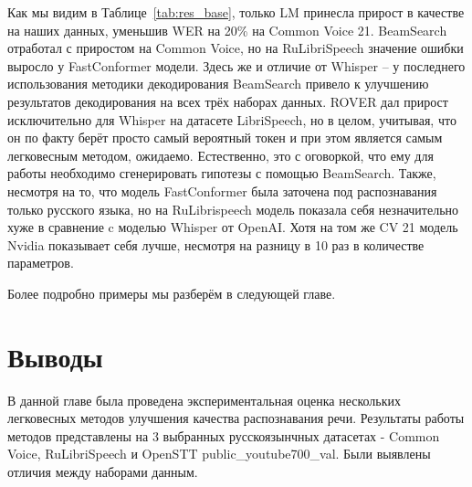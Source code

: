 Как мы видим в Таблице~\ref{tab:res_base}, только LM принесла прирост в качестве на наших данных, уменьшив WER на 20\% на Common Voice 21.
BeamSearch отработал с приростом на Common Voice, но на RuLibriSpeech значение ошибки выросло у FastConformer модели.
Здесь же и отличие от Whisper -- у последнего использования методики декодирования BeamSearch привело к улучшению результатов декодирования на всех трёх наборах данных.
ROVER дал прирост исключительно для Whisper на датасете LibriSpeech, но в целом, учитывая, что он по факту берёт просто самый вероятный токен и при этом является самым легковесным методом, ожидаемо.
Естественно, это с оговоркой, что ему для работы необходимо сгенерировать гипотезы с помощью BeamSearch.
Также, несмотря на то, что модель FastConformer была заточена под распознавания только русского языка, но на RuLibrispeech модель показала себя незначительно хуже в сравнение c моделью Whisper от OpenAI.
Хотя на том же CV 21 модель Nvidia показывает себя лучше, несмотря на разницу в 10 раз в количестве параметров.

Более подробно примеры мы разберём в следующей главе.

\section{Выводы}
В данной главе была проведена экспериментальная оценка нескольких легковесных методов улучшения качества распознавания речи.
Результаты работы методов представлены на 3 выбранных русскоязынчных датасетах - Common Voice, RuLibriSpeech и OpenSTT public\_youtube700\_val.
Были выявлены отличия между наборами данным.